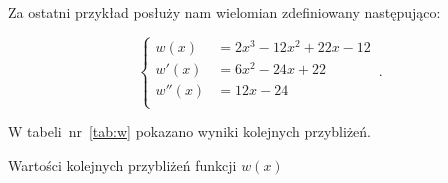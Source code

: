 \documentclass{article}
\begin{document}
    Za ostatni przykład posłuży nam wielomian zdefiniowany następująco:

    \begin{equation*}
      \begin{cases}
        w(x)   &= 2x^3 - 12x^2 + 22x -12 \\
        w'(x)  &= 6x^2 - 24x + 22        \\
        w''(x) &= 12x - 24               \\
      \end{cases}\,.
    \end{equation*}

    W tabeli~nr~\ref{tab:w} pokazano wyniki kolejnych przybliżeń.

    \begin{table}[!htb]
      \caption{Wartości kolejnych przybliżeń funkcji $w(x)$}
      \label{tab:w}


\end{table}
\end{document}
